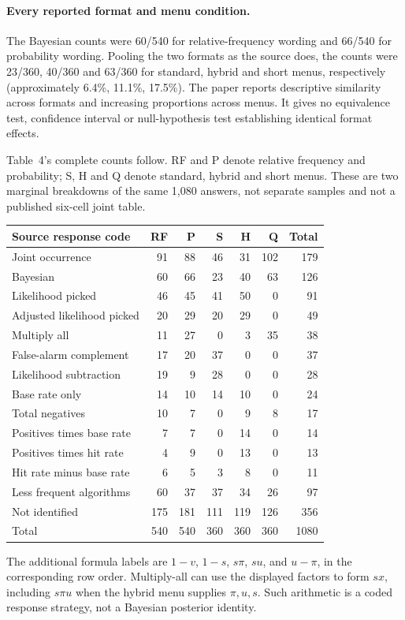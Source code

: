 \paragraph{Every reported format and menu condition.}
The Bayesian counts were 60/540 for relative-frequency wording and 66/540
for probability wording. Pooling the two formats as the source does, the
counts were 23/360, 40/360 and 63/360 for standard, hybrid and short menus,
respectively (approximately 6.4\%, 11.1\%, 17.5\%). The paper reports
descriptive similarity across formats and increasing proportions across
menus. It gives no equivalence test, confidence interval or null-hypothesis
test establishing identical format effects.

Table~4's complete counts follow. RF and P denote relative frequency and
probability; S, H and Q denote standard, hybrid and short menus. These are
two marginal breakdowns of the same 1,080 answers, not separate samples
and not a published six-cell joint table.
\begin{center}\small
\begin{tabular}{lrrrrrr}
Source response code&RF&P&S&H&Q&Total\\\hline
Joint occurrence&91&88&46&31&102&179\\
Bayesian&60&66&23&40&63&126\\
Likelihood picked&46&45&41&50&0&91\\
Adjusted likelihood picked&20&29&20&29&0&49\\
Multiply all&11&27&0&3&35&38\\
False-alarm complement&17&20&37&0&0&37\\
Likelihood subtraction&19&9&28&0&0&28\\
Base rate only&14&10&14&10&0&24\\
Total negatives&10&7&0&9&8&17\\
Positives times base rate&7&7&0&14&0&14\\
Positives times hit rate&4&9&0&13&0&13\\
Hit rate minus base rate&6&5&3&8&0&11\\
Less frequent algorithms&60&37&37&34&26&97\\
Not identified&175&181&111&119&126&356\\\hline
Total&540&540&360&360&360&1080
\end{tabular}
\end{center}
The additional formula labels are \(1-v\), \(1-s\), \(s\pi\),
\(su\), and \(u-\pi\), in the corresponding row order. Multiply-all
can use the displayed factors to form \(sx\), including \(s\pi u\)
when the hybrid menu supplies \(\pi,u,s\). Such arithmetic is a coded
response strategy, not a Bayesian posterior identity.

